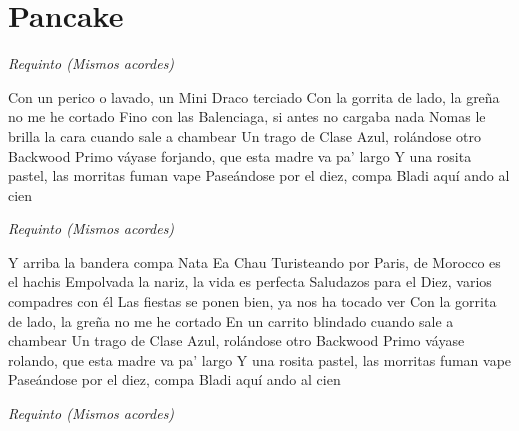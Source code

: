 \section{Pancake}

\noindent
\vspace{1cm}

\begin{guitar}
	\begin{multicols}{2}

		\textit{Requinto (Mismos acordes)}

		Con un perico o lavado, un Mini Draco terciado
		Con la gorrita de lado, la greña no me he cortado
		Fino con las Balenciaga, si antes no cargaba nada
		Nomas le brilla la cara cuando sale a chambear
		Un trago de Clase Azul, rolándose otro Backwood
		Primo váyase forjando, que esta madre va pa' largo
		Y una rosita pastel, las morritas fuman vape
		Paseándose por el diez, compa Bladi aquí ando al cien

		\textit{Requinto (Mismos acordes)}

		Y arriba la bandera compa Nata
		Ea
		Chau
		Turisteando por Paris, de Morocco es el hachis
		Empolvada la nariz, la vida es perfecta
		Saludazos para el Diez, varios compadres con él
		Las fiestas se ponen bien, ya nos ha tocado ver
		Con la gorrita de lado, la greña no me he cortado
		En un carrito blindado cuando sale a chambear
		Un trago de Clase Azul, rolándose otro Backwood
		Primo váyase rolando, que esta madre va pa' largo
		Y una rosita pastel, las morritas fuman vape
		Paseándose por el diez, compa Bladi aquí ando al cien

		\textit{Requinto (Mismos acordes)}
	\end{multicols}
\end{guitar}
